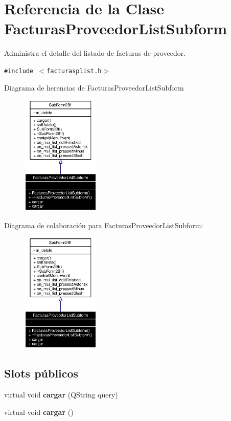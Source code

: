 \section{Referencia de la Clase Facturas\-Proveedor\-List\-Subform}
\label{classFacturasProveedorListSubform}
Administra el detalle del listado de facturas de proveedor.  


{\tt \#include $<$facturasplist.h$>$}

Diagrama de herencias de Facturas\-Proveedor\-List\-Subform\begin{figure}[H]
\begin{center}
\leavevmode
\includegraphics[width=106pt]{classFacturasProveedorListSubform__inherit__graph}
\end{center}
\end{figure}
Diagrama de colaboraci\'{o}n para Facturas\-Proveedor\-List\-Subform:\begin{figure}[H]
\begin{center}
\leavevmode
\includegraphics[width=106pt]{classFacturasProveedorListSubform__coll__graph}
\end{center}
\end{figure}
\subsection*{Slots p\'{u}blicos}
\begin{CompactItemize}
\item 
virtual void {\bf cargar} (QString query)\label{classFacturasProveedorListSubform_i0}

\item 
virtual void {\bf cargar} ()\label{classFacturasProveedorListSubform_i1}

\end{CompactItemize}
